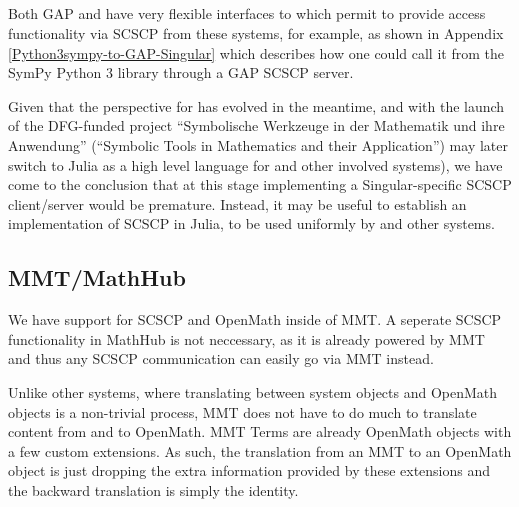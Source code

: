 \documentclass{deliverablereport}
\begin{document}
\subsection{\Singular}

Both GAP and \Sage have very flexible interfaces to \Singular
which permit to provide access \Singular functionality via SCSCP
from these systems, for example, as shown in 
Appendix \ref{Python3sympy-to-GAP-Singular} which 
describes how one could call it from the SymPy Python 3 library 
through a GAP SCSCP server.


Given that the perspective for \Singular has evolved in the meantime,
and with the launch of the DFG-funded project 
``Symbolische Werkzeuge in der Mathematik und ihre Anwendung''
(``Symbolic Tools in Mathematics and their Application'')
\Singular may later switch to Julia as a high level language 
for \Singular and other involved systems), we have come to the
conclusion that at this stage implementing a Singular-specific
SCSCP client/server would be premature. Instead, it may be useful
to establish an implementation of SCSCP in Julia, to be used 
uniformly by \Singular and other systems.


\subsection{MMT/MathHub}

We have support for SCSCP and OpenMath inside of MMT.
A seperate SCSCP functionality in MathHub is not neccessary, as it is already powered by MMT and thus any SCSCP communication can easily go via MMT instead.

Unlike other systems, where translating between system objects and OpenMath objects is a non-trivial process, MMT does not have to do much to translate content from and to OpenMath.
MMT Terms are already OpenMath objects with a few custom extensions.
As such, the translation from an MMT to an OpenMath object is just dropping the extra information provided by these extensions and the backward translation is simply the identity.
\end{document}

